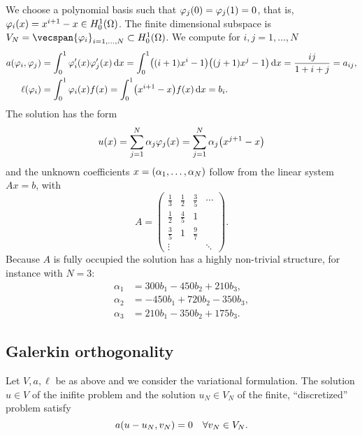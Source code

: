 \begin{example}
    We choose a polynomial basis such that \(\varphi_j\parentheses*{0} = \varphi_j\parentheses*{1} = 0\), that is, \(\varphi_i\parentheses*{x} = x^{i + 1} - x \in H_0^1\parentheses*{\Omega}\).
    The finite dimensional subspace is \(V_N = \vecspan\braces*{\varphi_i}_{i = 1, \ldots, N} \subset H_0^1\parentheses*{\Omega}\).
    We compute for \(i, j = 1, \ldots, N\)
    \begin{align*}
        a\parentheses*{\varphi_i, \varphi_j} &= \int_0^1 \varphi_i'\parentheses*{x}\varphi_j'\parentheses*{x}\d x = \int_0^1 \parentheses*{\parentheses*{i + 1}x^i - 1}\parentheses*{\parentheses*{j + 1}x^j - 1}\d x = \frac{ij}{1 + i + j} = a_{ij},\\
        \ell\parentheses*{\varphi_i} &= \int_0^1 \varphi_i\parentheses*{x}f\parentheses*{x} = \int_0^1 \parentheses*{x^{i + 1} - x}f\parentheses*{x}\d x = b_i.
    \end{align*}
    The solution has the form
    \[
        u\parentheses*{x} = \sum_{j = 1}^N \alpha_j \varphi_j\parentheses*{x} = \sum_{j = 1}^N \alpha_j \parentheses*{x^{j + 1} - x}
    \]
    and the unknown coefficients \(x = \parentheses*{\alpha_1, \ldots, \alpha_N}\) follow from the linear system \(Ax = b\), with
    \[
        A = \begin{pmatrix}
            \frac{1}{3} & \frac{1}{2} & \frac{3}{5} & \cdots \\
            \frac{1}{2} & \frac{4}{5} & 1 & \\
            \frac{3}{5} & 1 & \frac{9}{7} & \\
            \vdots & & & \ddots
        \end{pmatrix}.
    \]
    Because \(A\) is fully occupied the solution has a highly non-trivial structure, for instance with \(N = 3\):
    \begin{align*}
        \alpha_1 &= 300b_1 - 450b_2 + 210b_3,\\
        \alpha_2 &= -450b_1 + 720b_2 - 350b_3,\\
        \alpha_3 &= 210b_1 - 350b_2 + 175b_3.
    \end{align*}
\end{example}


\subsection{Galerkin orthogonality}

\begin{theorem}
    Let \(V, a, \ell\) be as above and we consider the variational formulation.
    The solution \(u \in V\) of the inifite problem and the solution \(u_N \in V_N\) of the finite, ``discretized'' problem satisfy
    \[
        a\parentheses*{u - u_N, v_N} = 0 \quad \forall v_N \in V_N.
    \]
\end{theorem}

